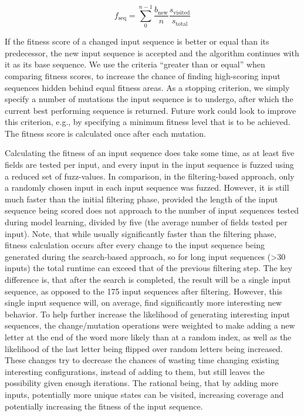 \begin{equation}f_\mathrm{seq} = \sum_{0}^{n-1} \frac{b_\mathrm{new}}{n} \frac{s_\mathrm{visited}}{s_\mathrm{total}} \end{equation} \label{eq:scoring}

If the fitness score of a changed input sequence is better or equal than its predecessor, the new input sequence is accepted and the algorithm continues with it as its base sequence. We use the criteria ``greater than or equal'' when comparing fitness scores, to increase the chance of finding high-scoring input sequences hidden behind equal fitness areas. As a stopping criterion, we simply specify a number of mutations the input sequence is to undergo, after which the current best performing sequence is returned. Future work could look to improve this criterion, e.g., by specifying a minimum fitness level that is to be achieved. The fitness score is calculated once after each mutation.

Calculating the fitness of an input sequence does take some time, as at least five fields are tested per input, and every input in the input sequence is fuzzed using a reduced set of fuzz-values. In comparison, in the filtering-based approach, only a randomly chosen input in each input sequence was fuzzed. However, it is still much faster than the initial filtering phase, provided the length of the input sequence being scored does not approach to the number of input sequences tested during model learning, divided by five (the average number of fields tested per input). Note, that while usually significantly faster than the filtering phase, fitness calculation occurs after every change to the input sequence being generated during the search-based approach, so for long input sequences (>30 inputs) the total runtime can exceed that of the previous filtering step. The key difference is, that after the search is completed, the result will be a single input sequence, as opposed to the 175 input sequences after filtering. However, this single input sequence will, on average, find significantly more interesting new behavior. To help further increase the likelihood of generating interesting input sequences, the change/mutation operations were weighted to make adding a new letter at the end of the word more likely than at a random index, as well as the likelihood of the last letter being flipped over random letters being increased. These changes try to decrease the chances of wasting time changing existing interesting configurations, instead of adding to them, but still leaves the possibility given enough iterations. The rational being, that by adding more inputs, potentially more unique states can be visited, increasing coverage and potentially increasing the fitness of the input sequence. 

